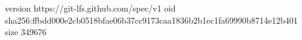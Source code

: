 version https://git-lfs.github.com/spec/v1
oid sha256:ffbdd000e2cb0518bfae06b37cc9173caa1836b2b1ec1fa69990b8714e12b401
size 349676
